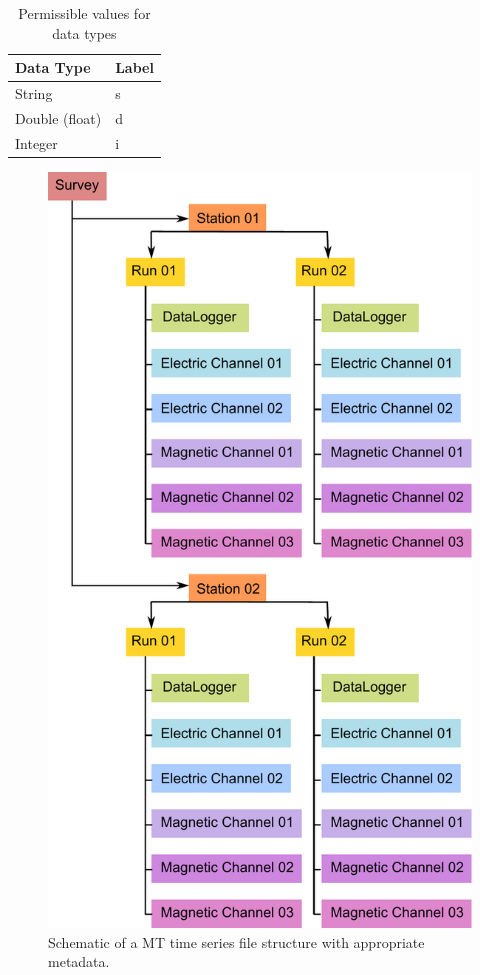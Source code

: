 \documentclass{article}
\begin{document}
\begin{table}[htb!]
	\centering
	\caption[Data types]{Permissible values for data types}
	\begin{tabular}{|l|l|}
		\hline
		\textbf{Data Type} & \textbf{Label} \\
		\hline
		String & s \\ \hline
		Double (float) & d \\ \hline
		Integer & i \\
		\hline
	\end{tabular}
	\label{tab:types}
\end{table}

\begin{figure}[htb!]
	\centering
	\includegraphics[height=.9\textheight]{example_mt_file_structure.pdf}
	\caption{Schematic of a MT time series file structure with appropriate metadata.}
	\label{fig:example}
\end{figure}
\end{document}
